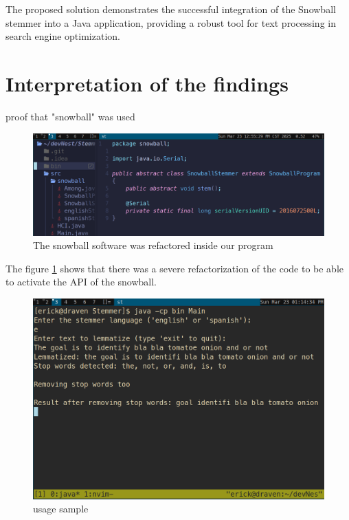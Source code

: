 \documentclass[twoside]{article}
\begin{document}
The proposed solution demonstrates the successful integration of the Snowball stemmer into a Java application, providing a robust tool for text processing in search engine optimization.

\section{Interpretation of the findings} 

{\large proof that "snowball" was used}

\begin{figure}[H]
  \centering
  \includegraphics[width=1\textwidth]{imgs/proveSnow.png}
  \caption{The snowball software was refactored inside our program}
  \label{fig:1}
\end{figure}

The figure \ref{fig:1} shows that there was a severe refactorization of the code to be able to activate the API of the snowball. 

\begin{figure}[H]
  \centering
  \includegraphics[width=1\textwidth]{imgs/use1.png}
  \caption{usage sample}
  \label{fig:2}
\end{figure}
\end{document}
